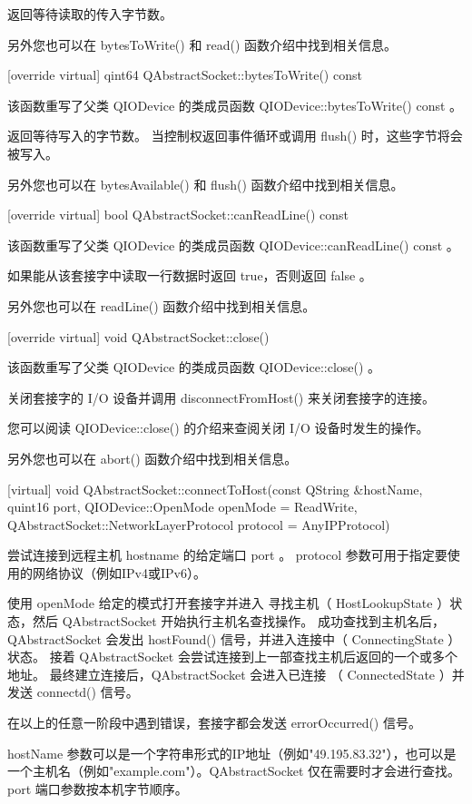 返回等待读取的传入字节数。

另外您也可以在 bytesToWrite() 和 read() 函数介绍中找到相关信息。

[override virtual] qint64 QAbstractSocket::bytesToWrite() const

该函数重写了父类 QIODevice 的类成员函数 QIODevice::bytesToWrite() const 。

返回等待写入的字节数。 当控制权返回事件循环或调用 flush() 时，这些字节将会被写入。

另外您也可以在 bytesAvailable() 和 flush() 函数介绍中找到相关信息。

[override virtual] bool QAbstractSocket::canReadLine() const

该函数重写了父类 QIODevice 的类成员函数 QIODevice::canReadLine() const 。

如果能从该套接字中读取一行数据时返回 true，否则返回 false 。

另外您也可以在 readLine() 函数介绍中找到相关信息。

[override virtual] void QAbstractSocket::close()

该函数重写了父类 QIODevice 的类成员函数 QIODevice::close() 。

关闭套接字的 I/O 设备并调用 disconnectFromHost() 来关闭套接字的连接。

您可以阅读 QIODevice::close() 的介绍来查阅关闭 I/O 设备时发生的操作。

另外您也可以在 abort() 函数介绍中找到相关信息。

[virtual] void QAbstractSocket::connectToHost(const QString \&hostName,
quint16 port, QIODevice::OpenMode openMode = ReadWrite,
QAbstractSocket::NetworkLayerProtocol protocol = AnyIPProtocol)

尝试连接到远程主机 hostname 的给定端口 port 。 protocol 参数可用于指定要使用的网络协议（例如IPv4或IPv6）。

使用 openMode 给定的模式打开套接字并进入 寻找主机（ HostLookupState ）状态，然后 QAbstractSocket 开始执行主机名查找操作。 成功查找到主机名后， QAbstractSocket 会发出 hostFound() 信号，并进入连接中（ ConnectingState ）状态。 接着 QAbstractSocket 会尝试连接到上一部查找主机后返回的一个或多个地址。 最终建立连接后，QAbstractSocket 会进入已连接 （ ConnectedState ）并发送 connectd() 信号。

在以上的任意一阶段中遇到错误，套接字都会发送 errorOccurred() 信号。

hostName 参数可以是一个字符串形式的IP地址（例如"49.195.83.32"），也可以是一个主机名（例如"example.com"）。QAbstractSocket 仅在需要时才会进行查找。 port 端口参数按本机字节顺序。

